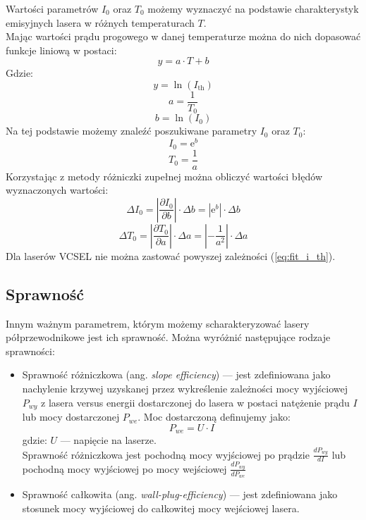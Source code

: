 Wartości parametrów $I_0$ oraz $T_0$ możemy wyznaczyć na podstawie charakterystyk
emisyjnych lasera w różnych temperaturach $T$. \\
Mając wartości prądu progowego w danej temperaturze  można do nich dopasować funkcje liniową w postaci:
\begin{equation}
y = a \cdot T + b
\end{equation}
Gdzie:
\begin{equation}
y = \ln(I_{\mathrm{th}})
\end{equation}
\begin{equation}
a = \frac{1}{T_0}
\end{equation}
\begin{equation}
b = \ln(I_0)
\end{equation}
Na tej podstawie możemy znaleźć poszukiwane parametry $I_0$ oraz $T_0$:
\begin{equation}
I_0 = \mathrm{e}^b
\end{equation}
\begin{equation}
T_0 = \frac{1}{a}
\end{equation}
Korzystając z metody różniczki zupełnej można obliczyć wartości błędów wyznaczonych wartości:
\begin{equation}
\Delta I_0 = \left\lvert \frac{\partial I_{0}}{\partial b} \right\rvert \cdot \Delta b = | \mathrm{e}^b | \cdot \Delta b
\end{equation}
\begin{equation}
\Delta T_0 = \left\lvert \frac{\partial T_{0}}{\partial a} \right\rvert \cdot \Delta a = \left\lvert -\frac{1}{a^2} \right\rvert \cdot \Delta a
\end{equation}
Dla laserów VCSEL nie można zastować powyszej zależności (\ref{eq:fit_i_th}).
\subsection{Sprawność}
Innym ważnym parametrem, którym możemy scharakteryzować lasery półprzewodnikowe jest ich sprawność. Można wyróżnić następujące rodzaje sprawności:
\begin{itemize}
\item Sprawność różniczkowa (ang. \textit{slope efficiency}) --- jest zdefiniowana jako nachylenie krzywej uzyskanej przez wykreślenie zależności
mocy wyjściowej $P_{wy}$ z lasera versus energii dostarczonej do lasera w postaci natężenie prądu $I$ lub mocy dostarczonej $P_{we}$.
Moc dostarczoną definujemy jako:
\begin{equation}
P_{we} = U \cdot I
\end{equation}
gdzie: $U$ --- napięcie na laserze. \\
Sprawność różniczkowa jest pochodną mocy wyjściowej po prądzie $\frac{dP_{wy}}{dI}$ lub pochodną mocy wyjściowej po mocy wejściowej $\frac{dP_{wy}}{dP_{we}}$
\item Sprawność całkowita (ang. \textit{wall-plug-efficiency}) --- jest zdefiniowana jako stosunek mocy wyjściowej do całkowitej mocy wejściowej lasera.
\end{itemize}
\newpage

